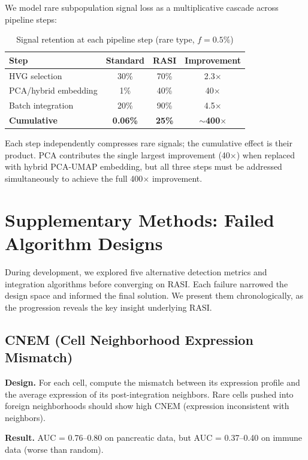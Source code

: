 \documentclass[10pt]{article}
\begin{document}
We model rare subpopulation signal loss as a multiplicative cascade across pipeline steps:

\begin{table}[h]
\centering
\caption{Signal retention at each pipeline step (rare type, $f = 0.5\%$)}
\begin{tabular}{lccc}
\toprule
Step & Standard & RASI & Improvement \\
\midrule
HVG selection & 30\% & 70\% & 2.3$\times$ \\
PCA/hybrid embedding & 1\% & 40\% & 40$\times$ \\
Batch integration & 20\% & 90\% & 4.5$\times$ \\
\midrule
\textbf{Cumulative} & \textbf{0.06\%} & \textbf{25\%} & \textbf{$\sim$400$\times$} \\
\bottomrule
\end{tabular}
\end{table}

Each step independently compresses rare signals; the cumulative effect is their product. PCA contributes the single largest improvement (40$\times$) when replaced with hybrid PCA-UMAP embedding, but all three steps must be addressed simultaneously to achieve the full 400$\times$ improvement.

\section{Supplementary Methods: Failed Algorithm Designs}

During development, we explored five alternative detection metrics and integration algorithms before converging on RASI. Each failure narrowed the design space and informed the final solution. We present them chronologically, as the progression reveals the key insight underlying RASI.

\subsection{CNEM (Cell Neighborhood Expression Mismatch)}

\textbf{Design.} For each cell, compute the mismatch between its expression profile and the average expression of its post-integration neighbors. Rare cells pushed into foreign neighborhoods should show high CNEM (expression inconsistent with neighbors).

\textbf{Result.} AUC = 0.76--0.80 on pancreatic data, but AUC = 0.37--0.40 on immune data (worse than random).
\end{document}
